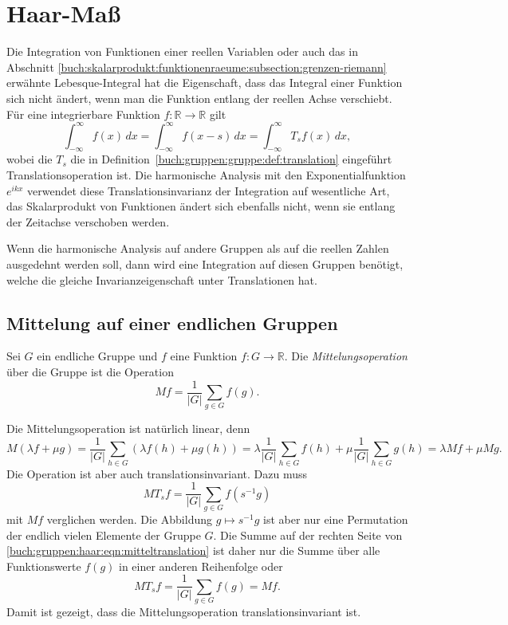 %
%
%
\section{Haar-Maß
\label{buch:gruppen:section:haar}}
Die Integration von Funktionen einer reellen Variablen oder auch
das in Abschnitt
\ref{buch:skalarprodukt:funktionenraeume:subsection:grenzen-riemann}
erwähnte Lebesque-Integral hat die Eigenschaft, dass das
Integral einer Funktion sich nicht ändert, wenn man die Funktion
entlang der reellen Achse verschiebt.
Für eine integrierbare Funktion $f\colon\mathbb{R}\to\mathbb{R}$
gilt
\[
\int_{-\infty}^\infty f(x)\,dx
=
\int_{-\infty}^\infty f(x-s)\,dx
=
\int_{-\infty}^\infty T_sf(x)\,dx,
\]
wobei die $T_s$ die in Definition~\ref{buch:gruppen:gruppe:def:translation}
eingeführt Translationsoperation ist.
Die harmonische Analysis mit den Exponentialfunktion $e^{ikx}$ 
verwendet diese Translationsinvarianz der Integration auf wesentliche Art,
das Skalarprodukt von Funktionen ändert sich ebenfalls nicht, wenn sie
entlang der Zeitachse verschoben werden.

Wenn die harmonische Analysis auf andere Gruppen als auf die reellen
Zahlen ausgedehnt werden soll, dann wird eine Integration auf diesen
Gruppen benötigt, welche die gleiche Invarianzeigenschaft unter
Translationen hat.

%
%
\subsection{Mittelung auf einer endlichen Gruppen
\label{buch:haar:subsection:endlich}}

\begin{definition}
\label{buch:gruppen:haar:def:mittelung}
Sei $G$ ein endliche Gruppe und $f$ eine Funktion $f\colon G\to \mathbb{R}$.
Die {\em Mittelungsoperation} über die Gruppe ist die Operation
\[
Mf = \frac{1}{|G|}\sum_{g\in G} f(g).
\]
\end{definition}

Die Mittelungsoperation ist natürlich linear, denn
\[
M(\lambda f + \mu g)
=
\frac{1}{|G|}
\sum_{h\in G}
(\lambda f(h)+\mu g(h))
=
\lambda \frac{1}{|G|}\sum_{h\in G}f(h)
+
\mu \frac{1}{|G|}\sum_{h\in G}g(h)
=
\lambda Mf + \mu Mg.
\]
Die Operation ist aber auch translationsinvariant.
Dazu muss
\begin{equation}
MT_sf
=
\frac{1}{|G|}
\sum_{g\in G} f(s^{-1}g)
\label{buch:gruppen:haar:eqn:mitteltranslation}
\end{equation}
mit $Mf$ verglichen werden.
Die Abbildung $g\mapsto s^{-1}g$ ist aber nur eine Permutation der endlich
vielen Elemente der Gruppe $G$.
Die Summe auf der rechten Seite von
\eqref{buch:gruppen:haar:eqn:mitteltranslation}
ist daher nur die Summe über alle Funktionswerte $f(g)$ in einer anderen
Reihenfolge oder
\[
MT_sf
=
\frac{1}{|G|} \sum_{g\in G}f(g)
=Mf.
\]
Damit ist gezeigt, dass die Mittelungsoperation translationsinvariant
ist.

